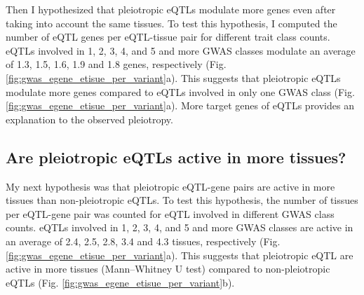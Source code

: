 Then I hypothesized that pleiotropic eQTLs modulate more genes even after taking into account the same tissues.
%
To test this hypothesis, I computed the number of eQTL genes per eQTL-tissue pair for different trait class counts.
%
%
eQTLs involved in 1, 2, 3, 4, and 5 and more GWAS classes modulate an average of 1.3, 1.5, 1.6, 1.9 and 1.8 genes, respectively (Fig. \ref{fig:gwas_egene_etisue_per_variant}a).
%
This suggests that pleiotropic eQTLs modulate more genes compared to eQTLs involved in only one GWAS class (Fig. \ref{fig:gwas_egene_etisue_per_variant}a).
%
More target genes of eQTLs provides an explanation to the observed pleiotropy.

%
\subsection*{Are pleiotropic eQTLs active in more tissues?}
%

My next hypothesis was that pleiotropic eQTL-gene pairs are active in more tissues than non-pleiotropic eQTLs.
%
To test this hypothesis, the number of tissues per eQTL-gene pair was counted for eQTL involved in different GWAS class counts.
%
eQTLs involved in 1, 2, 3, 4, and 5 and more GWAS classes are active in an average of 2.4, 2.5, 2.8, 3.4 and 4.3 tissues, respectively (Fig. \ref{fig:gwas_egene_etisue_per_variant}a).
%
This suggests that pleiotropic eQTL are active in more tissues (Mann–Whitney U test) compared to non-pleiotropic eQTLs (Fig. \ref{fig:gwas_egene_etisue_per_variant}b).

